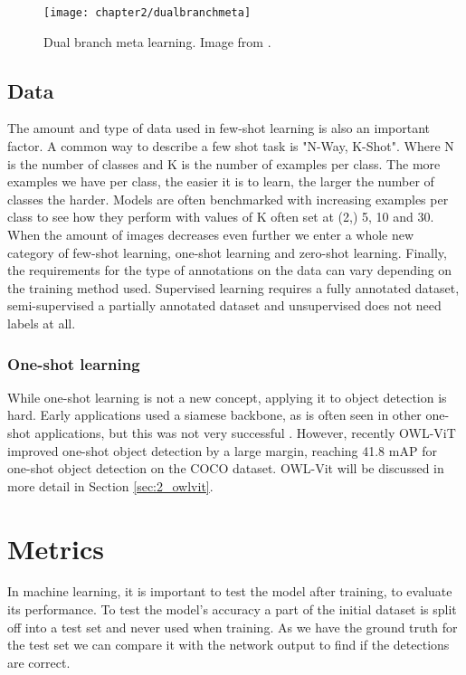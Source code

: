 \begin{figure}[H]
	\centering
	\texttt{[image: chapter2/dualbranchmeta]}
	\caption{\label{fig:2_dualbranchmeta} Dual branch meta learning. Image from \citet{few-shot-comprehensive-survey}.}
\end{figure}

\subsection{Data}

The amount and type of data used in few-shot learning is also an important factor. A common way to describe a few shot task is "N-Way, K-Shot". Where N is the number of classes and K is the number of examples per class. The more examples we have per class, the easier it is to learn, the larger the number of classes the harder. Models are often benchmarked with increasing examples per class to see how they perform with values of K often set at (2,) 5, 10 and 30. When the amount of images decreases even further we enter a whole new category of few-shot learning, one-shot learning and zero-shot learning. Finally, the requirements for the type of annotations on the data can vary depending on the training method used. Supervised learning requires a fully annotated dataset, semi-supervised a partially annotated dataset and unsupervised does not need labels at all.

\subsubsection*{One-shot learning}

While one-shot learning is not a new concept, applying it to object detection is hard. Early applications used a siamese backbone, as is often seen in other one-shot applications, but this was not very successful \citep{One-shot-siamese}. However, recently OWL-ViT \citep{owlvit} improved one-shot object detection by a large margin, reaching 41.8 mAP for one-shot object detection on the COCO dataset. OWL-Vit will be discussed in more detail in Section \ref{sec:2_owlvit}.


\section{Metrics}\label{sec:2_metrics}
In machine learning, it is important to test the model after training, to evaluate its performance. To test the model's accuracy a part of the initial dataset is split off into a test set and never used when training. As we have the ground truth for the test set we can compare it with the network output to find if the detections are correct. 

